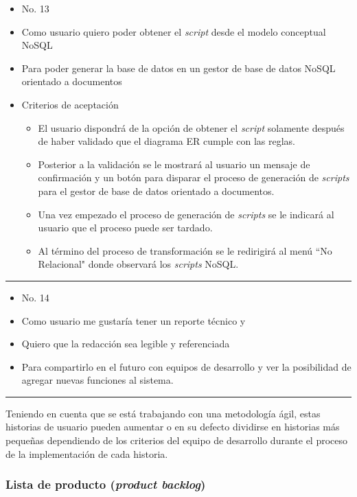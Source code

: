 \begin{itemize}
	\item No. 13
	\item Como usuario quiero poder obtener el \textit{script} desde el modelo conceptual NoSQL
	\item Para poder generar la base de datos en un gestor de base de datos NoSQL orientado a documentos
	\item Criterios de aceptación
	\begin{itemize}
		\item El usuario dispondrá de la opción de obtener el \textit{script} solamente después de haber validado que el diagrama ER cumple con las reglas.
		\item Posterior a la validación se le mostrará al usuario un mensaje de confirmación y un botón para disparar el proceso de generación de \textit{scripts} para el gestor de base de datos orientado a documentos.
		\item Una vez empezado el proceso de generación de \textit{scripts} se le indicará al usuario que el proceso puede ser tardado.
		\item Al término del proceso de transformación se le redirigirá al menú ``No Relacional" donde observará los \textit{scripts} NoSQL.
	\end{itemize}
\end{itemize}

\noindent\rule{\textwidth}{1pt}
\begin{itemize}
	\item No. 14
	\item Como usuario me gustaría tener un reporte técnico y
	\item Quiero que la redacción sea legible y referenciada
	\item Para compartirlo en el futuro con equipos de desarrollo y ver la posibilidad de agregar nuevas funciones al sistema.
\end{itemize}
\noindent\rule{\textwidth}{1pt}




Teniendo en cuenta que se está trabajando con una metodología ágil, estas historias de usuario pueden aumentar o en su defecto dividirse en historias más pequeñas dependiendo de los criterios del equipo de desarrollo durante el proceso de la implementación de cada historia.




\subsubsection{Lista de producto (\textit{product backlog})}

